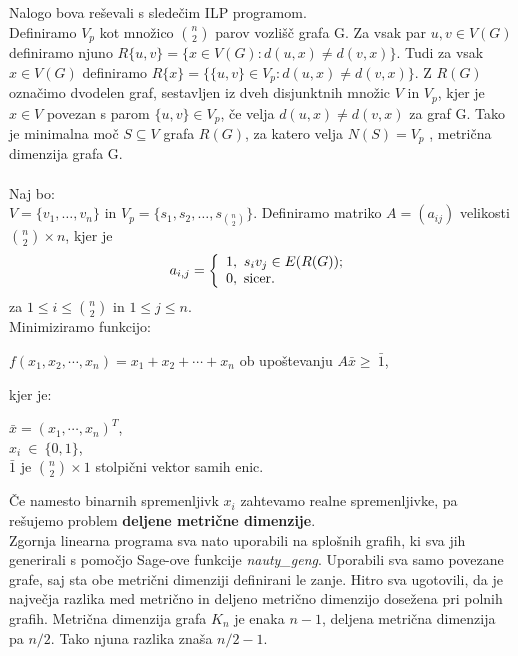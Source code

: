 \documentclass[a4paper]{report}
\begin{document}
Nalogo bova reševali s sledečim ILP programom.\\

Definiramo $V_p$ kot množico $\binom{n}{2}$ parov vozlišč grafa G. Za vsak par $u,v \in V(G)$ definiramo njuno $R\{u,v\}=\{x \in V(G): d(u,x)\neq d(v,x)\}.$ Tudi za vsak $x \in V(G)$ definiramo $R\{x\}= \{\{u,v\}\in V_p: d(u,x)\neq d(v,x)\}$. Z $R(G)$ označimo dvodelen graf, sestavljen iz dveh disjunktnih množic $V$ in $V_p$, kjer je $x \in V$ povezan s parom $\{u,v\} \in V_p$, če velja $d(u,x)\neq d(v,x)$ za graf G.  Tako je minimalna moč $S \subseteq V$ grafa $R(G)$, za katero velja $N(S) = V_p$  , metrična dimenzija grafa G. \\\\
Naj bo:\\
$V = \{v_1,\dots, v_n\}$ in $V_p = \{s_1,s_2,\dots,s_{\binom{n}{2}} \} $. Definiramo matriko  $ A = (a_{ij})$  velikosti $\binom{n}{2} \times n$, kjer je\[ a_{i,j}  =  \left \{ \begin{array}{l}1,\ \mbox{$ s_i v_j \in E(R(G))$}; \\0,\ \mbox{sicer}. \end{array} \right. \]
za $1\le i\le \binom{n}{2}$ in $1\le  j\le n$.\\

 Minimiziramo funkcijo: \begin{center}$f(x_1,x_2, \cdots,x_n)=x_1+x_2+\cdots+x_n$ 
ob upoštevanju $A\bar{x}\ge\ \bar{1}$,\end{center} 
kjer je: \begin{center}
 $\bar{x}=(x_1,\cdots,x_n)^T$,\\
$x_i\ \in\ \{0,1 \}$,\\
$\bar{1}$ je $\binom{n}{2}\times 1$  stolpični vektor samih enic. \end{center}
Če namesto binarnih spremenljivk $x_i$ zahtevamo realne spremenljivke, pa rešujemo problem \textbf{deljene metrične dimenzije}. \\

Zgornja linearna programa sva nato uporabili na splošnih grafih, ki sva jih generirali s pomočjo Sage-ove funkcije \textit{nauty\_geng}. Uporabili sva samo povezane grafe, saj sta obe metrični dimenziji definirani le zanje. Hitro sva ugotovili, da je največja razlika med metrično in deljeno metrično dimenzijo dosežena pri polnih grafih. Metrična dimenzija grafa $K_n$ je enaka $n-1$, deljena metrična dimenzija pa $n/2$. Tako njuna razlika znaša $n/2-1$. \\
\end{document}
